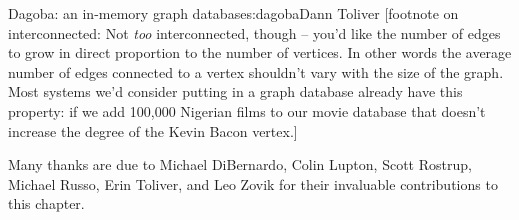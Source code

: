 \begin{aosachapter}{Dagoba: an in-memory graph database}{s:dagoba}{Dann Toliver}
{[}footnote on interconnected: Not \emph{too} interconnected, though --
you'd like the number of edges to grow in direct proportion to the
number of vertices. In other words the average number of edges connected
to a vertex shouldn't vary with the size of the graph. Most systems we'd
consider putting in a graph database already have this property: if we
add 100,000 Nigerian films to our movie database that doesn't increase
the degree of the Kevin Bacon vertex.{]}

\label{acknowledgements}

Many thanks are due to Michael DiBernardo, Colin Lupton, Scott Rostrup,
Michael Russo, Erin Toliver, and Leo Zovik for their invaluable
contributions to this chapter.

\end{aosachapter}
